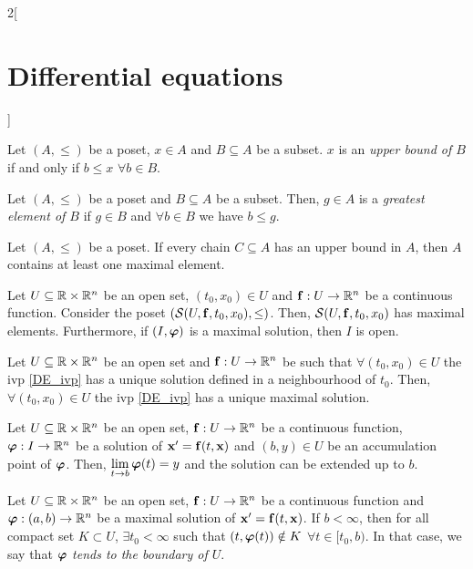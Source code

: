 \documentclass[../../../main.tex]{subfiles}
\begin{document}
\begin{multicols}{2}[\section{Differential equations}]
  \begin{definition}
    Let $(A,\leq )$ be a poset, $x\in A$ and $B\subseteq A$ be a subset. $x$ is an \textit{upper bound of $B$} if and only if $b\leq x$ $\forall b\in B$.
  \end{definition}
  \begin{definition}
    Let $(A,\leq )$ be a poset and $B\subseteq A$ be a subset. Then, $g\in A$ is a \textit{greatest element of $B$} if $g\in B$ and $\forall b\in B$ we have $b \leq  g$.
  \end{definition}
  \begin{lemma}
    Let $(A,\leq )$ be a poset. If every chain $C\subseteq A$ has an upper bound in $A$, then $A$ contains at least one maximal element.
  \end{lemma}
  \begin{theorem}
    Let $U\subseteq\mathbb{R}\times\mathbb{R}^n$ be an open set, $(t_0,x_0)\in U$ and $\boldsymbol{\mathrm{f}}:U\rightarrow\mathbb{R}^n$ be a continuous function. Consider the poset $(\mathcal{S}(U,\boldsymbol{\mathrm{f}},t_0,x_0),\leq)$. Then, $\mathcal{S}(U,\boldsymbol{\mathrm{f}},t_0,x_0)$ has maximal elements. Furthermore, if $(I,\boldsymbol{\mathrm{\varphi}})$ is a maximal solution, then $I$ is open.
  \end{theorem}
  \begin{prop}
    Let $U\subseteq\mathbb{R}\times\mathbb{R}^n$ be an open set and $\boldsymbol{\mathrm{f}}:U\rightarrow\mathbb{R}^n$ be such that $\forall(t_0,x_0)\in U$ the ivp \eqref{DE_ivp} has a unique solution defined in a neighbourhood of $t_0$. Then, $\forall(t_0,x_0)\in U$ the ivp \eqref{DE_ivp} has a unique maximal solution.
  \end{prop}
  \begin{lemma}
    Let $U\subseteq\mathbb{R}\times\mathbb{R}^n$ be an open set, $\boldsymbol{\mathrm{f}}:U\rightarrow\mathbb{R}^n$ be a continuous function, $\boldsymbol{\mathrm{\varphi}}:I\rightarrow\mathbb{R}^n$ be a solution of $\boldsymbol{\mathrm{x}}'=\boldsymbol{\mathrm{f}}(t,\boldsymbol{\mathrm{x}})$ and $(b,y)\in U$ be an accumulation point of $\boldsymbol{\mathrm{\varphi}}$. Then, $\displaystyle\lim_{t\to b}\boldsymbol{\mathrm{\varphi}}(t)=y$ and the solution can be extended up to $b$.
  \end{lemma}
  \begin{corollary}
    Let $U\subseteq\mathbb{R}\times\mathbb{R}^n$ be an open set, $\boldsymbol{\mathrm{f}}:U\rightarrow\mathbb{R}^n$ be a continuous function and $\boldsymbol{\mathrm{\varphi}}:(a,b)\rightarrow\mathbb{R}^n$ be a maximal solution of $\boldsymbol{\mathrm{x}}'=\boldsymbol{\mathrm{f}}(t,\boldsymbol{\mathrm{x}})$. If $b<\infty$, then for all compact set $K\subset U$, $\exists t_0<\infty$ such that $(t,\boldsymbol{\mathrm{\varphi}}(t))\notin K$ $\forall t\in[t_0,b)$. In that case, we say that $\boldsymbol{\mathrm{\varphi}}$ \textit{tends to the boundary of $U$}.
  \end{corollary}

\end{multicols}
\end{document}
